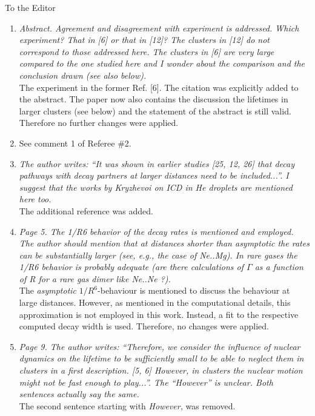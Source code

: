 \documentclass[DIN,pagenumber=false,parskip=half,fromalign=left,fromphone=true,fromemail=true,fromurl=false,fromlogo=false,fromrule=false]{scrlttr2}
\begin{document}
\begin{letter}{To the Editor}
\begin{enumerate}
 \item \emph{Abstract. Agreement and disagreement with experiment is addressed. Which experiment? That in [6] or that in [12]? The clusters in [12] do not correspond to those addressed here. The clusters in [6] are very large compared to the one studied here and I wonder about the comparison and the conclusion drawn (see also below).}\\
       The experiment in the former Ref. [6]. The citation was explicitly added to the
       abstract. The paper now also contains the discussion the lifetimes
       in larger clusters (see below) and the statement of the abstract is still valid.
       Therefore no further changes were applied.

 \item See comment 1 of Referee \#2.
 \item \emph{The author writes: “It was shown in earlier studies [25, 12, 26] that decay pathways with decay partners at larger distances need to be included...”. I suggest that the works by Kryzhevoi on ICD in He droplets are mentioned here too.}\\
       The additional reference was added.

 \item \emph{Page 5. The 1/R6 behavior of the decay rates is mentioned and employed. The author should mention that at distances shorter than asymptotic the rates can be substantially larger (see, e.g., the case of Ne..Mg). In rare gases the 1/R6 behavior is probably adequate (are there calculations of $\Gamma$ as a function of R for a rare gas dimer like Ne..Ne ?).}\\
       The \emph{asymptotic} $1/R^6$-behaviour is mentioned to discuss the
       behaviour at large distances. However, as mentioned in the computational
       details, this approximation is not employed in this work. Instead, a
       fit to the respective computed decay width is used. Therefore, no
       changes were applied.

 \item \emph{Page 9. The author writes: “Therefore, we consider the influence of nuclear dynamics on the lifetime to be sufficiently small to be able to neglect them in clusters in a first description. [5, 6] However, in
clusters the nuclear motion might not be fast enough to play...”. The “However” is unclear. Both sentences actually say the same.}\\
       The second sentence starting with \emph{However, } was removed.


\end{enumerate}
\end{letter}
\end{document}
